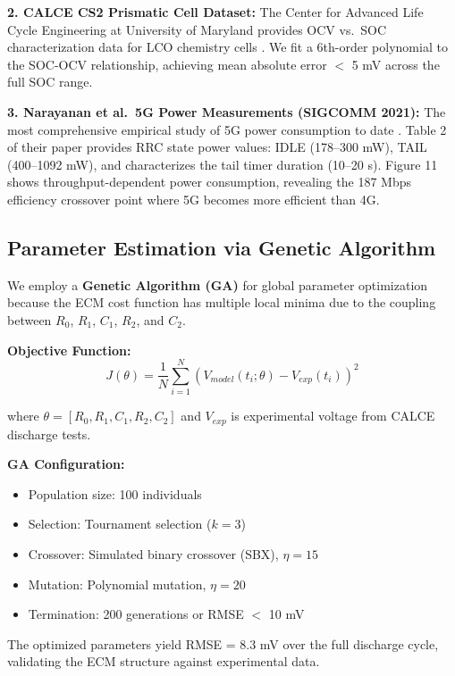 \documentclass[12pt]{article}
\begin{document}
\textbf{2. CALCE CS2 Prismatic Cell Dataset:}
The Center for Advanced Life Cycle Engineering at University of Maryland provides OCV vs.\ SOC characterization data for LCO chemistry cells \cite{calce_cs2}. We fit a 6th-order polynomial to the SOC-OCV relationship, achieving mean absolute error $<$ 5 mV across the full SOC range.

\textbf{3. Narayanan et al.\ 5G Power Measurements (SIGCOMM 2021):}
The most comprehensive empirical study of 5G power consumption to date \cite{narayanan_5g}. Table 2 of their paper provides RRC state power values: IDLE (178--300 mW), TAIL (400--1092 mW), and characterizes the tail timer duration (10--20 s). Figure 11 shows throughput-dependent power consumption, revealing the 187 Mbps efficiency crossover point where 5G becomes more efficient than 4G.

\subsection{Parameter Estimation via Genetic Algorithm}

We employ a \textbf{Genetic Algorithm (GA)} for global parameter optimization because the ECM cost function has multiple local minima due to the coupling between $R_0$, $R_1$, $C_1$, $R_2$, and $C_2$.

\textbf{Objective Function:}
\begin{equation}
    J(\theta) = \frac{1}{N} \sum_{i=1}^{N} \left( V_{model}(t_i; \theta) - V_{exp}(t_i) \right)^2
\end{equation}

where $\theta = [R_0, R_1, C_1, R_2, C_2]$ and $V_{exp}$ is experimental voltage from CALCE discharge tests.

\textbf{GA Configuration:}
\begin{itemize}
    \item Population size: 100 individuals
    \item Selection: Tournament selection ($k=3$)
    \item Crossover: Simulated binary crossover (SBX), $\eta = 15$
    \item Mutation: Polynomial mutation, $\eta = 20$
    \item Termination: 200 generations or RMSE $<$ 10 mV
\end{itemize}

The optimized parameters yield RMSE = 8.3 mV over the full discharge cycle, validating the ECM structure against experimental data.
\end{document}
